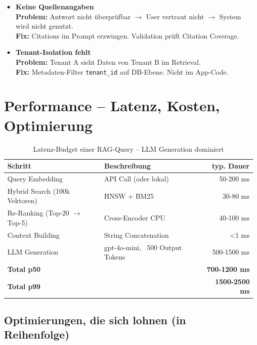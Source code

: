\begin{itemize}
    \item \textbf{Keine Quellenangaben} \hfill \\
    \textbf{Problem:} Antwort nicht überprüfbar $\to$ User vertraut nicht $\to$ System wird nicht genutzt. \\
    \textbf{Fix:} Citations im Prompt erzwingen. Validation prüft Citation Coverage.
    
    \item \textbf{Tenant-Isolation fehlt} \hfill \\
    \textbf{Problem:} Tenant A sieht Daten von Tenant B im Retrieval. \\
    \textbf{Fix:} Metadaten-Filter \texttt{tenant\_id} auf DB-Ebene. Nicht im App-Code.
\end{itemize}

\section{Performance -- Latenz, Kosten, Optimierung}

\begin{table}[H]
\centering
\begin{tabularx}{\linewidth}{lXr}
\toprule
\textbf{Schritt} & \textbf{Beschreibung} & \textbf{typ. Dauer} \\
\midrule
Query Embedding & API Call (oder lokal) & 50-200 ms \\
Hybrid Search (100k Vektoren) & HNSW + BM25 & 30-80 ms \\
Re-Ranking (Top-20 $\to$ Top-5) & Cross-Encoder CPU & 40-100 ms \\
Context Building & String Concatenation & <1 ms \\
LLM Generation & gpt-4o-mini, ~500 Output Tokens & 500-1500 ms \\
\midrule
\textbf{Total p50} & & \textbf{700-1200 ms} \\
\textbf{Total p99} & & \textbf{1500-2500 ms} \\
\bottomrule
\end{tabularx}
\caption{Latenz-Budget einer RAG-Query -- LLM Generation dominiert}
\label{tab:rag-latency}
\end{table}

\subsection{Optimierungen, die sich lohnen (in Reihenfolge)}

